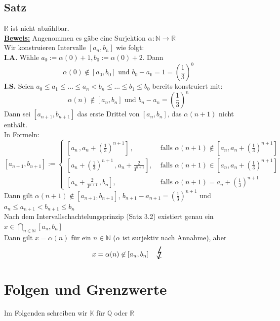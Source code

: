 \subsection{Satz} %
\label{sub:satz}
$\mathds{R}$ ist nicht abzählbar. 
\vspace{\baselineskip} \\
\underline{\textbf{Beweis:}} Angenommen es gäbe eine Surjektion $\alpha : \mathds{N} \to \mathds{R}$ \\
Wir konstruieren Intervalle $[a_n , b_n]$ wie folgt:
\vspace{\baselineskip} \\
\textbf{I.A.} Wähle $a_0 := \alpha (0) +1 , b_0 := \alpha (0) +2$. Dann 
\[
	\alpha (0) \not\in [a_0 , b_0] \text{ und } b_0 - a_0 = 1 = (\frac{1}{3})^0 
\]
\textbf{I.S.} Seien $a_0 \leq a_1 \leq \ldots \leq a_n < b_n \leq \ldots \leq b_1 \leq b_0$ bereits konstruiert mit:
\[
	\alpha (n) \not\in [a_n , b_n] \text{ und } b_n - a_n = (\frac{1}{3})^n
\]
Dann sei $[a_{n+1}, b_{n+1}]$ das erste Drittel von $[a_n , b_n]$, das $\alpha (n+1)$ nicht enthält. 
\vspace{\baselineskip} \\
In Formeln:
\[
	[a_{n+1} , b_{n+1}] := \begin{cases}
		[a_n \, , a_n+(\frac{1}{3})^{n+1}] \, , &\text{ falls }
		\alpha (n+1) \not\in [a_n , a_n +(\frac{1}{3})^{n+1}]\\
		[a_n+(\frac{1}{3})^{n+1} \, , a_n + \frac{2}{3^{n+1}}] , &\text{ falls } 
		\alpha (n+1) \in [a_n , a_n +(\frac{1}{3})^{n+1}] \\
		[a_n + \frac{2}{3^{n+1}} \, , b_n] , &\text{ falls } \alpha (n+1) = a_n + (\frac{1}{3})^{n+1}
	\end{cases}
\]
Dann gilt $\alpha (n+1) \not\in [a_{n+1} , b_{n+1}]$, $b_{n+1} -a_{n+1} = (\frac{1}{3})^{n+1}$ und 
$ a_n \leq a_{n+1} < b_{n+1} \leq b_n$
\vspace{\baselineskip} \\
Nach dem Intervallschachtelungsprinzip (Satz 3.2) existiert genau ein 
$x \in \underset{n \in \mathds{N}}{\bigcap} [a_n , b_n]$
\vspace{\baselineskip} \\
Dann gilt $x = \alpha (n)$ für ein $n \in \mathds{N}$ ($\alpha$ ist surjektiv nach Annahme), aber 
\[
	x = \alpha (n) \not\in [a_n , b_n] \quad \text{\huge $\lightning$}
\]

\section{Folgen und Grenzwerte} %
\label{sec:folgen_und_grenzwerte}
Im Folgenden schreiben wir $\mathds{K}$ für $\mathds{Q}$ oder $\mathds{R}$
